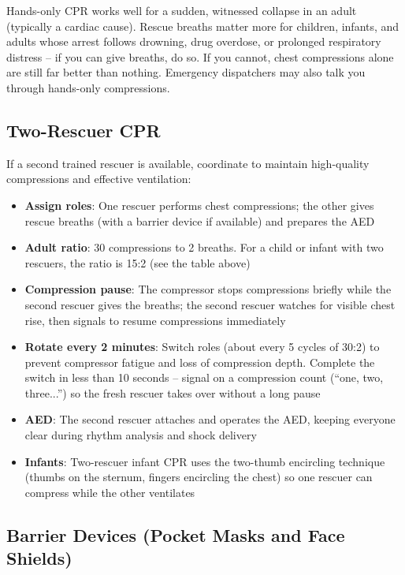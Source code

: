 Hands-only CPR works well for a sudden, witnessed collapse in an adult (typically a cardiac cause). Rescue breaths matter more for children, infants, and adults whose arrest follows drowning, drug overdose, or prolonged respiratory distress -- if you can give breaths, do so. If you cannot, chest compressions alone are still far better than nothing. Emergency dispatchers may also talk you through hands-only compressions.

\subsection{Two-Rescuer CPR}

If a second trained rescuer is available, coordinate to maintain high-quality compressions and effective ventilation:

\begin{itemize}[leftmargin=*]
  \item \textbf{Assign roles}: One rescuer performs chest compressions; the other gives rescue breaths (with a barrier device if available) and prepares the AED
  \item \textbf{Adult ratio}: 30 compressions to 2 breaths. For a child or infant with two rescuers, the ratio is 15:2 (see the table above)
  \item \textbf{Compression pause}: The compressor stops compressions briefly while the second rescuer gives the breaths; the second rescuer watches for visible chest rise, then signals to resume compressions immediately
  \item \textbf{Rotate every 2 minutes}: Switch roles (about every 5 cycles of 30:2) to prevent compressor fatigue and loss of compression depth. Complete the switch in less than 10 seconds -- signal on a compression count (``one, two, three...'') so the fresh rescuer takes over without a long pause
  \item \textbf{AED}: The second rescuer attaches and operates the AED, keeping everyone clear during rhythm analysis and shock delivery
  \item \textbf{Infants}: Two-rescuer infant CPR uses the two-thumb encircling technique (thumbs on the sternum, fingers encircling the chest) so one rescuer can compress while the other ventilates
\end{itemize}

\subsection{Barrier Devices (Pocket Masks and Face Shields)}

